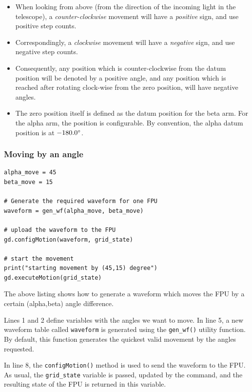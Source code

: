 \documentclass[11pt,a4paper]{report}
\begin{document}
\begin{itemize}
  \item When looking from above (from the direction of the incoming
    light in the telescope), a \emph{counter-clockwise} movement will
    have a \emph{positive} sign, and use positive step counts.
  \item Correspondingly, a \emph{clockwise} movement will have a
    \emph{negative} sign, and use negative step counts.
  \item Consequently, any position which is counter-clockwise from the
    datum position will be denoted by a positive angle, and any
    position which is reached after rotating clock-wise from the zero
    position, will have negative angles.
  \item The zero position itself is defined as the datum position for
    the beta arm. For the alpha arm, the position is configurable. By
    convention, the alpha datum position is at $-180.0\degree$.
\end{itemize}

\subsubsection{Moving by an angle}
\begin{verbatim}
alpha_move = 45
beta_move = 15

# Generate the required waveform for one FPU
waveform = gen_wf(alpha_move, beta_move)

# upload the waveform to the FPU
gd.configMotion(waveform, grid_state)

# start the movement
print("starting movement by (45,15) degree")
gd.executeMotion(grid_state)
\end{verbatim}

The above listing shows how to generate a waveform which moves the FPU
by a certain (alpha,beta) angle difference.

Lines 1 and 2 define variables with the angles we want to move. In
line 5, a new waveform table called \texttt{waveform} is generated
using the \texttt{gen\_wf()} utility function.  By default, this
function generates the quickest valid movement by the angles
requested.

In line 8, the \texttt{configMotion()} method is used to send the
waveform to the FPU. As usual, the \texttt{grid\_state} variable is
passed, updated by the command, and the resulting state of the FPU is
returned in this variable.
\end{document}
